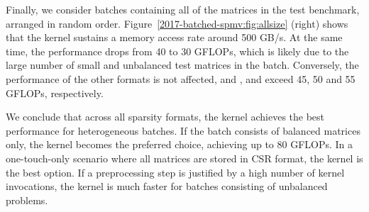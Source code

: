 Finally, we consider batches containing all of the matrices  in the test 
benchmark,
arranged in random order. Figure~\ref{2017-batched-spmv:fig:allsize} (right) shows that the \ell 
kernel sustains
a memory access rate around 500 GB/s. At the same time, the performance drops 
from 
40  to 30 GFLOPs, which is likely due to the large number of small and 
unbalanced 
test matrices in the batch.
Conversely, the performance of the other formats is not affected,
and \csrsmart, \csri and \coo
exceed 45, 50 and 55 GFLOPs, respectively.

We conclude that across all sparsity formats, the \coo kernel achieves the best 
performance
for heterogeneous batches. If the batch consists of balanced matrices only, 
the \ell kernel becomes the preferred choice, achieving up to 80 GFLOPs. In a 
one-touch-only
scenario where all matrices are stored in CSR format, the \csrsmart kernel is 
the best option.
If a preprocessing step is justified by a high number of kernel invocations, 
the \csri kernel
is much faster for batches consisting of unbalanced problems.
